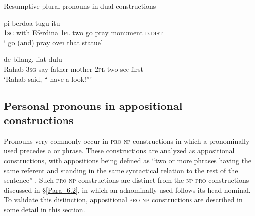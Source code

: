 \begin{styleExampleTitle}
Resumptive plural pronouns in dual  constructions
\end{styleExampleTitle}

\ea
\label{Example_6.37}
 {} {} {} {} {pi} {berdoa} {tugu} {itu}\\ %
 \textsc{1sg}  with  Eferdina  \textsc{1pl}  two  go  pray  monument  \textsc{d.dist}\\

\glt
‘ go (and) pray over that statue’ \textstyleExampleSource{[080917-008-NP.0003]}
\z

\ea
\label{Example_6.38}
 {de} {bilang,} {} {} {} {} {liat} {dulu}\\ %
 Rahab  \textsc{3sg}  say  father  mother  \textsc{2pl}  two  see  first\\
\glt
‘Rahab said, `` have a look!''' \textstyleExampleSource{[081006-035-CvEx.0044]}
\z


\subsection{Personal pronouns in appositional constructions}
\label{Para_6.1.6}
Pronouns very commonly occur in \textsc{pro} \textsc{np} constructions in which a pronominally used  precedes a  or  phrase. These constructions are analyzed as appositional constructions, with appositions being defined as “two or more  phrases having the same referent and standing in the same syntactical relation to the rest of the sentence” {\citep[5193]{Asher.1994}}. Such \textsc{pro} \textsc{np} constructions are distinct from the \textsc{np} \textsc{pro} constructions discussed in §\ref{Para_6.2}, in which an adnominally used  follows its head nominal. To validate this distinction, appositional \textsc{pro} \textsc{np} constructions are described in some detail in this section.



